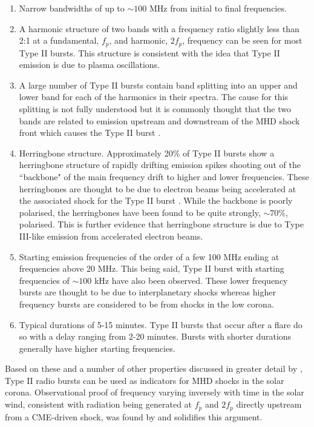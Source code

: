 \begin{enumerate}
    \item Narrow bandwidths of up to $\sim 100$ MHz from initial to final frequencies.
    \item A harmonic structure of two bands with a frequency ratio slightly less than 2:1 at a fundamental, $f_p$, and harmonic, $2f_p$, frequency can be seen for most Type II bursts. This structure is consistent with the idea that Type II emission is due to plasma oscillations.
    \item A large number of Type II bursts contain band splitting into an upper and lower band for each of the harmonics in their spectra. The cause for this splitting is not fully understood but it is commonly thought that the two bands are related to emission upstream and downstream of the MHD shock front which causes the Type II burst \citep{Smerd1974,NelsonandMelrose1985, Vrsnak2002}.
    \item Herringbone structure. Approximately 20\% of Type II bursts show a herringbone structure of rapidly drifting emission spikes shooting out of the ``backbone" of the main frequency drift to higher and lower frequencies. These herringbones are thought to be due to electron beams being accelerated at the associated shock for the Type II burst \citep{Mann1995}. While the backbone is poorly polarised, the herringbones have been found to be quite strongly, $\sim 70\%$, polarised. This is further evidence that herringbone structure is due to Type III-like emission from accelerated electron beams.
    \item Starting emission frequencies of the order of a few 100 MHz ending at frequencies above 20 MHz. This being said, Type II burst with starting frequencies of $\sim 100$ kHz have also been observed. 
    These lower frequency bursts are thought to be due to interplanetary shocks whereas higher frequency bursts are considered to be from shocks in the low corona.
    \item Typical durations of 5-15 minutes. Type II bursts that occur after a flare do so with a delay ranging from 2-20 minutes. Bursts with shorter durations generally have higher starting frequencies. %
\end{enumerate}
 
Based on these and a number of other properties discussed in greater detail by \cite{NelsonandMelrose1985}, Type II radio bursts can be used as indicators for MHD shocks in the solar corona. Observational proof of frequency varying inversely with time in the solar wind, consistent with radiation being generated at $f_p$ and $2f_p$ directly upstream from a CME-driven shock, was found by \cite{Reiner1997} and solidifies this argument.
